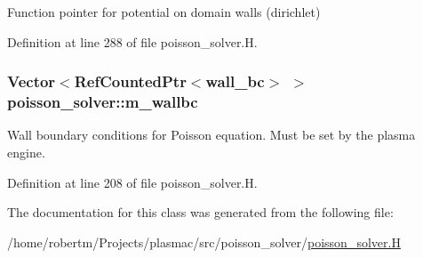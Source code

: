 Function pointer for potential on domain walls (dirichlet) 



Definition at line 288 of file poisson\+\_\+solver.\+H.

\subsubsection[{\texorpdfstring{m\+\_\+wallbc}{m_wallbc}}]{\setlength{\rightskip}{0pt plus 5cm}Vector$<$Ref\+Counted\+Ptr$<${\bf wall\+\_\+bc}$>$ $>$ poisson\+\_\+solver\+::m\+\_\+wallbc\hspace{0.3cm}{\ttfamily [protected]}}\hypertarget{classpoisson__solver_aacdcbf78b6b7685f05a4aec0ba552567}{}\label{classpoisson__solver_aacdcbf78b6b7685f05a4aec0ba552567}


Wall boundary conditions for Poisson equation. Must be set by the plasma engine. 



Definition at line 208 of file poisson\+\_\+solver.\+H.



The documentation for this class was generated from the following file\+:\begin{DoxyCompactItemize}
\item 
/home/robertm/\+Projects/plasmac/src/poisson\+\_\+solver/\hyperlink{poisson__solver_8H}{poisson\+\_\+solver.\+H}\end{DoxyCompactItemize}
